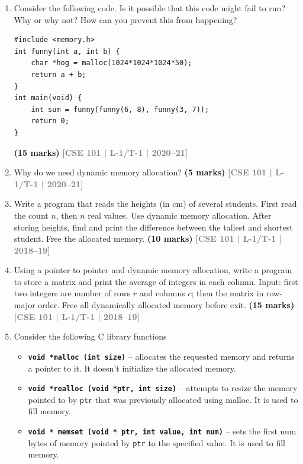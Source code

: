 \documentclass[12pt,a3paper]{article}
\newcommand{\yr}[1]{\hfill\textcolor{gray}{\small\textbf{[#1]}}}
\newcommand{\mk}[1]{\textcolor{orange!70!black}{\small\textbf{(#1 marks)}}}
\begin{document}
\begin{enumerate}
\mk{12} \yr{CSE 101 | L-1/T-1 | 2020--21}

\item Consider the following code. Is it possible that this code might fail to run? Why or why not? How can you prevent this from happening?
 
\begin{lstlisting}
#include <memory.h>
int funny(int a, int b) {
    char *hog = malloc(1024*1024*1024*50);
    return a + b;
}
int main(void) {
    int sum = funny(funny(6, 8), funny(3, 7));
    return 0;
}
\end{lstlisting}
\mk{15} \yr{CSE 101 | L-1/T-1 | 2020--21}

\item Why do we need dynamic memory allocation?
\mk{5} \yr{CSE 101 | L-1/T-1 | 2020--21}

\item Write a program that reads the heights (in cm) of several students. First read the count $n$, then $n$ real values. Use dynamic memory allocation. After storing heights, find and print the difference between the tallest and shortest student. Free the allocated memory.
\mk{10} \yr{CSE 101 | L-1/T-1 | 2018--19}

\item Using a pointer to pointer and dynamic memory allocation, write a program to store a matrix and print the average of integers in each column. Input: first two integers are number of rows $r$ and columns $c$; then the matrix in row-major order. Free all dynamically allocated memory before exit.
\mk{15} \yr{CSE 101 | L-1/T-1 | 2018--19}

\item Consider the following C library functions

    \begin{itemize}
        \item \texttt{\textbf{void *malloc (int size)}} -- allocates the requested memory and returns a pointer to it. It
        doesn't initialize the allocated memory.

        \item \texttt{\textbf{void *realloc (void *ptr, int size)}} -- attempts to resize the memory pointed to by \texttt{ptr}
        that was previously allocated using malloc. It is used to fill memory.

        \item \texttt{\textbf{void * memset (void * ptr, int value, int num)}} -- sets the first num bytes of memory
        pointed by \texttt{ptr} to the specified value. It is used to fill memory.


\end{itemize}
\end{enumerate}
\end{document}
